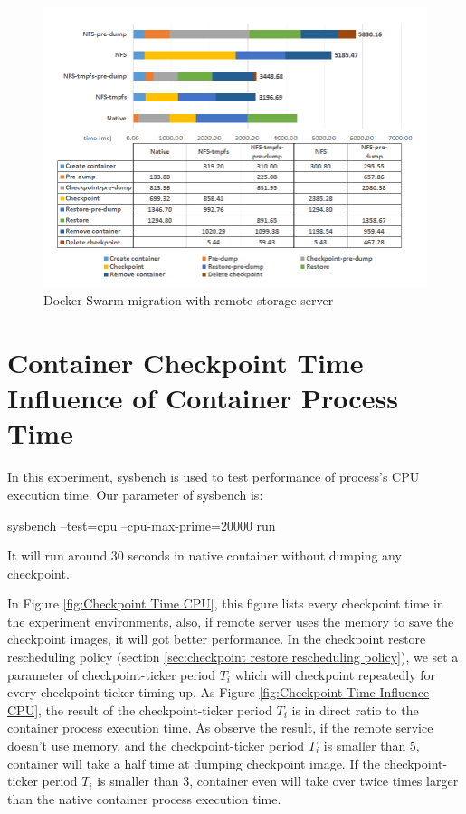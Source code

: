 \begin{figure}[h]
\includegraphics[width=17cm]{figure/migration_time.png}
\caption{Docker Swarm migration with remote storage server}
\label{fig:Docker Swarm migration time with remote storage server}
\end{figure}

\section{Container Checkpoint Time Influence of Container Process Time}
In this experiment, sysbench\cite{kopytov2004sysbench} is used to test performance of process's CPU execution time. Our parameter of sysbench is:
\begin{center}
sysbench --test=cpu --cpu-max-prime=20000 run
\end{center}
It will run around 30 seconds in native container without dumping any checkpoint.

In Figure \ref{fig:Checkpoint Time CPU}, this figure lists every checkpoint time in the experiment environments, also, if remote server uses the memory to save the checkpoint images, it will got better performance.
In the checkpoint restore rescheduling policy (section \ref{sec:checkpoint restore rescheduling policy}), we set a parameter of checkpoint-ticker period $ T_i $ which will checkpoint repeatedly for every checkpoint-ticker timing up.
As Figure \ref{fig:Checkpoint Time Influence CPU}, the result of the checkpoint-ticker period $ T_i $ is in direct ratio to the container process execution time.
As observe the result, if the remote service doesn't use memory, and the checkpoint-ticker period $ T_i $ is smaller than 5, container will take a half time at dumping checkpoint image. If the checkpoint-ticker period $ T_i $ is smaller than 3, container even will take over twice times larger than the native container process execution time.

